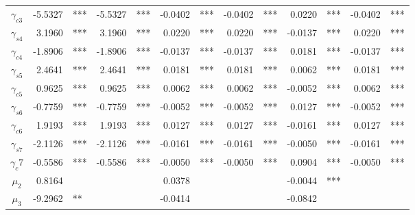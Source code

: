 \documentclass[3p]{elsarticle}
\begin{document}
\begin{table}[]
\begin{tabular}{crlrlrlrlrlrl}
\multicolumn{1}{c|}{$\gamma_{c3}$} & -5.5327         & ***       & -5.5327         & ***       & -0.0402        & ***        & -0.0402        & ***        & 0.0220         & ***        & -0.0402         & ***       \\
\multicolumn{1}{c|}{$\gamma_{s4}$} & 3.1960          & ***       & 3.1960          & ***       & 0.0220         & ***        & 0.0220         & ***        & -0.0137        & ***        & 0.0220         & ***       \\
\multicolumn{1}{c|}{$\gamma_{c4}$} & -1.8906         & ***       & -1.8906         & ***       & -0.0137        & ***        & -0.0137        & ***        & 0.0181         & ***        & -0.0137        & ***       \\
\multicolumn{1}{c|}{$\gamma_{s5}$} & 2.4641          & ***       & 2.4641          & ***       & 0.0181         & ***        & 0.0181         & ***        & 0.0062         & ***        & 0.0181         & ***       \\
\multicolumn{1}{c|}{$\gamma_{c5}$} & 0.9625          & ***       & 0.9625          & ***       & 0.0062         & ***        & 0.0062         & ***        & -0.0052        & ***        & 0.0062         & ***       \\
\multicolumn{1}{c|}{$\gamma_{s6}$} & -0.7759         & ***       & -0.7759         & ***       & -0.0052        & ***        & -0.0052        & ***        & 0.0127         & ***        & -0.0052        & ***       \\
\multicolumn{1}{c|}{$\gamma_{c6}$} & 1.9193          & ***       & 1.9193          & ***       & 0.0127         & ***        & 0.0127         & ***        & -0.0161        & ***        & 0.0127         & ***       \\
\multicolumn{1}{c|}{$\gamma_{s7}$} & -2.1126         & ***       & -2.1126         & ***       & -0.0161        & ***        & -0.0161        & ***        & -0.0050        & ***        & -0.0161        & ***       \\
\multicolumn{1}{c|}{$\gamma_c7$} & -0.5586         & ***       & -0.5586         & ***       & -0.0050        & ***        & -0.0050        & ***        & 0.0904         & ***        & -0.0050        & ***       \\
\multicolumn{1}{c|}{$\mu_2$}     & 0.8164          &           &                 &           & 0.0378         &            &                &            & -0.0044        & ***        &                 &           \\
\multicolumn{1}{c|}{$\mu_3$}     & -9.2962         & **        &                 &           & -0.0414        &            &                &            & -0.0842        &            &                 &           \\

\end{tabular}
\end{table}
\end{document}
